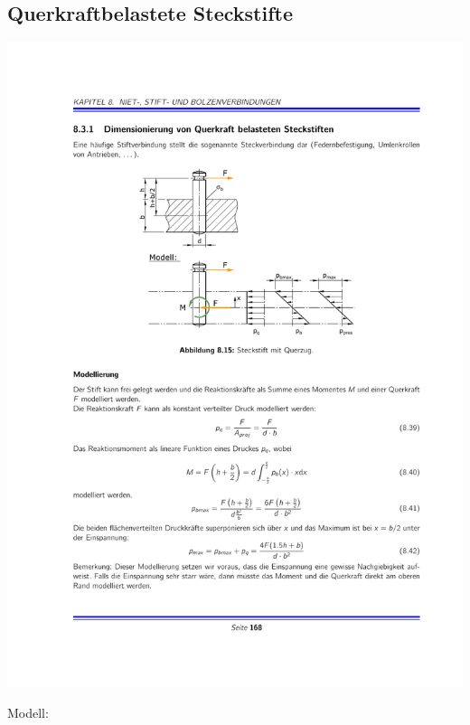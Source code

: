 	\subsection{Querkraftbelastete Steckstifte} %
		\begin{center}
			\includegraphics{graphics/steckstift_quer_1}
		\end{center}
		Modell: \\
